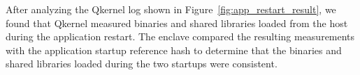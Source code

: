 After analyzing the Qkernel log shown in Figure~\ref{fig:app_restart_result}, we found that Qkernel measured binaries and shared libraries loaded from the host during the application restart. The enclave compared the resulting measurements with the application startup reference hash to determine that the binaries and shared libraries loaded during the two startups were 
consistent.






